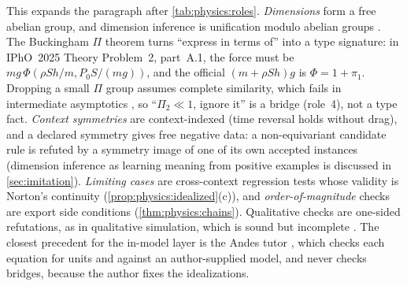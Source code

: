 This expands the paragraph after \cref{tab:physics:roles}. \emph{Dimensions} form a free
abelian group, and dimension inference is unification modulo abelian groups
\citep{kennedy1994dimension}. The Buckingham $\Pi$ theorem \citep{buckingham1914physically}
turns ``express in terms of'' into a type signature: in IPhO~2025 Theory Problem~2,
part~A.1, the force must be $mg\,\Phi(\rho Sh/m,P_0S/(mg))$, and the official
$(m+\rho Sh)g$ is $\Phi=1+\pi_1$. Dropping a small $\Pi$ group assumes complete similarity,
which fails in intermediate asymptotics \citep{barenblatt1996scaling}, so ``$\Pi_2\ll1$,
ignore it'' is a bridge (role~4), not a type fact. \emph{Context symmetries} are
context-indexed (time reversal holds without drag), and a declared symmetry gives free
negative data: a non-equivariant candidate rule is refuted by a symmetry image of one of
its own accepted instances (dimension inference as learning meaning from positive examples
is discussed in \cref{sec:imitation}). \emph{Limiting cases} are cross-context regression
tests whose validity is Norton's continuity (\cref{prop:physics:idealized}(c)), and
\emph{order-of-magnitude} checks are export side conditions (\cref{thm:physics:chains}).
Qualitative checks are one-sided refutations, as in qualitative simulation, which is sound
but incomplete \citep{kuipers1986qualitative}. The closest precedent for the in-model layer
is the Andes tutor \citep{vanlehn2005andes}, which checks each equation for units and
against an author-supplied model, and never checks bridges, because the author fixes the
idealizations.
